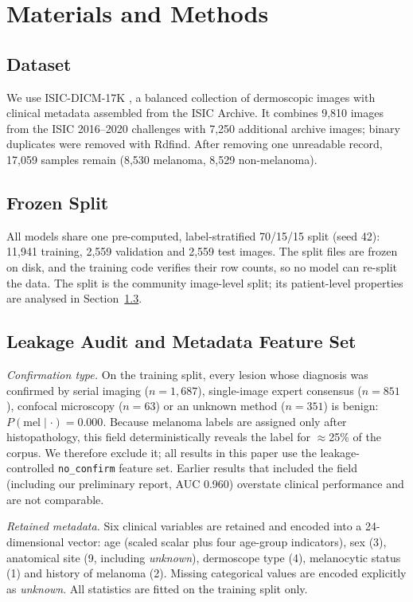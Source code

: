 \documentclass[journal]{IEEEtran}
\begin{document}
\section{Materials and Methods}
\subsection{Dataset}
We use ISIC-DICM-17K \cite{ahammed2025}, a balanced collection of dermoscopic images with clinical metadata assembled from the ISIC Archive. It combines 9,810 images from the ISIC 2016--2020 challenges \cite{cassidy2020} with 7,250 additional archive images; binary duplicates were removed with Rdfind. After removing one unreadable record, 17,059 samples remain (8,530 melanoma, 8,529 non-melanoma).

\subsection{Frozen Split}
All models share one pre-computed, label-stratified 70/15/15 split (seed 42): 11,941 training, 2,559 validation and 2,559 test images. The split files are frozen on disk, and the training code verifies their row counts, so no model can re-split the data. The split is the community image-level split; its patient-level properties are analysed in Section~\ref{sec:leak}.

\subsection{Leakage Audit and Metadata Feature Set}\label{sec:leak}
\textit{Confirmation type.} On the training split, every lesion whose diagnosis was confirmed by serial imaging ($n=1{,}687$), single-image expert consensus ($n=851$), confocal microscopy ($n=63$) or an unknown method ($n=351$) is benign: $P(\text{mel}\mid\cdot)=0.000$. Because melanoma labels are assigned only after histopathology, this field deterministically reveals the label for $\approx$25\% of the corpus. We therefore exclude it; all results in this paper use the leakage-controlled \texttt{no\_confirm} feature set. Earlier results that included the field (including our preliminary report, AUC 0.960) overstate clinical performance and are not comparable.

\textit{Retained metadata.} Six clinical variables are retained and encoded into a 24-dimensional vector: age (scaled scalar plus four age-group indicators), sex (3), anatomical site (9, including \emph{unknown}), dermoscope type (4), melanocytic status (1) and history of melanoma (2). Missing categorical values are encoded explicitly as \emph{unknown}. All statistics are fitted on the training split only.
\end{document}
